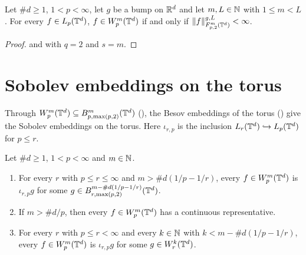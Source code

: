 \begin{corollary}
\label{cor:torus-sobolev-local-means}
\leanok
{}
Let $\#d \geq 1$, $1 < p < \infty$, let $g$ be a bump on $\mathbb{R}^d$ and let $m, L \in \mathbb{N}$ with
$1 \leq m < L$. For every $f \in L_p(\mathbb{T}^d)$, $f \in W^{m}_{p}(\mathbb{T}^d)$ if and only if
$\|f\|^{g,L}_{F^m_{p,2}(\mathbb{T}^d)} < \infty$.
\end{corollary}

\begin{proof}
\leanok
{} and  with $q = 2$ and
$s = m$.
\end{proof}

\section{Sobolev embeddings on the torus}
\label{sec:torus-sobolev-embedding}

Through $W^{m}_{p}(\mathbb{T}^d) \subseteq B^{m}_{p,\max(p,2)}(\mathbb{T}^d)$
(), the Besov embeddings of the torus
() give the Sobolev embeddings on the torus. Here $\iota_{r,p}$ is the
inclusion $L_r(\mathbb{T}^d) \hookrightarrow L_p(\mathbb{T}^d)$ for $p \leq r$.

\begin{theorem}
\label{thm:torus-sobolev-embedding}
\leanok
{}
Let $\#d \geq 1$, $1 < p < \infty$ and $m \in \mathbb{N}$.
\begin{enumerate}
  \item For every $r$ with $p \leq r \leq \infty$ and $m > \#d (1/p - 1/r)$, every
    $f \in W^{m}_{p}(\mathbb{T}^d)$ is $\iota_{r,p} g$ for some
    $g \in B^{m - \#d(1/p - 1/r)}_{r,\max(p,2)}(\mathbb{T}^d)$.
  \item If $m > \#d/p$, then every $f \in W^{m}_{p}(\mathbb{T}^d)$ has a continuous representative.
  \item For every $r$ with $p \leq r < \infty$ and every $k \in \mathbb{N}$ with
    $k < m - \#d (1/p - 1/r)$, every $f \in W^{m}_{p}(\mathbb{T}^d)$ is $\iota_{r,p} g$ for some
    $g \in W^{k}_{r}(\mathbb{T}^d)$.
\end{enumerate}
\end{theorem}


